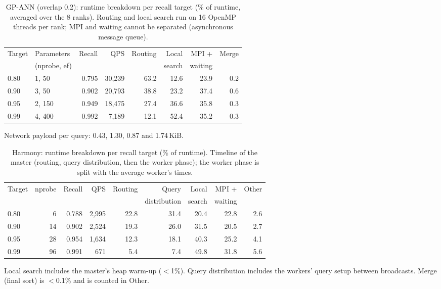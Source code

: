 \begin{table}[t]
\centering
\caption{GP-ANN (overlap 0.2): runtime breakdown per recall target (\% of runtime, averaged over the 8 ranks).
Routing and local search run on 16 OpenMP threads per rank; MPI and waiting cannot be separated (asynchronous message queue).}
\label{tab:breakdown-gp}
\small
\begin{tabular}{llrrrrrr}
\toprule
Target & Parameters & Recall & QPS & Routing & Local & MPI + & Merge \\
 & (nprobe, ef) & & & & search & waiting & \\
\midrule
0.80 & 1, 50  & 0.795 & 30{,}239 & 63.2 & 12.6 & 23.9 & 0.2 \\
0.90 & 3, 50  & 0.902 & 20{,}793 & 38.8 & 23.2 & 37.4 & 0.6 \\
0.95 & 2, 150 & 0.949 & 18{,}475 & 27.4 & 36.6 & 35.8 & 0.3 \\
0.99 & 4, 400 & 0.992 & 7{,}189  & 12.1 & 52.4 & 35.2 & 0.3 \\
\bottomrule
\end{tabular}

\vspace{2pt}
{\footnotesize Network payload per query: 0.43, 1.30, 0.87 and 1.74\,KiB.}
\end{table}

\begin{table}[t]
\centering
\caption{Harmony: runtime breakdown per recall target (\% of runtime).
Timeline of the master (routing, query distribution, then the worker phase); the worker phase is split with the average worker's times.}
\label{tab:breakdown-harmony}
\small
\begin{tabular}{lrrrrrrrr}
\toprule
Target & nprobe & Recall & QPS & Routing & Query & Local & MPI + & Other \\
 & & & & & distribution & search & waiting & \\
\midrule
0.80 & 6  & 0.788 & 2{,}995 & 22.8 & 31.4 & 20.4 & 22.8 & 2.6 \\
0.90 & 14 & 0.902 & 2{,}524 & 19.3 & 26.0 & 31.5 & 20.5 & 2.7 \\
0.95 & 28 & 0.954 & 1{,}634 & 12.3 & 18.1 & 40.3 & 25.2 & 4.1 \\
0.99 & 96 & 0.991 & 671     & 5.4  & 7.4  & 49.8 & 31.8 & 5.6 \\
\bottomrule
\end{tabular}

\vspace{2pt}
{\footnotesize Local search includes the master's heap warm-up ($<$1\%). Query distribution includes the workers' query setup between broadcasts. Merge (final sort) is $<$0.1\% and is counted in Other.}
\end{table}

